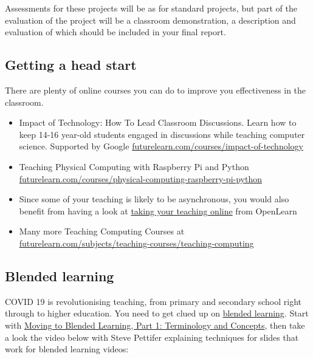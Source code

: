 \documentclass[
  12pt,
]{book}
\providecommand{\tightlist}{%
  \setlength{\itemsep}{0pt}\setlength{\parskip}{0pt}}
\begin{document}
Assessments for these projects will be as for standard projects, \citep{COMP30030, COMP30040} but part of the evaluation of the project will be a classroom demonstration, a description and evaluation of which should be included in your final report.

\hypertarget{getting-a-head-start}{%
\subsection{Getting a head start}\label{getting-a-head-start}}

There are plenty of online courses you can do to improve you effectiveness in the classroom.

\begin{itemize}
\tightlist
\item
  Impact of Technology: How To Lead Classroom Discussions. Learn how to keep 14-16 year-old students engaged in discussions while teaching computer science. Supported by Google \href{https://www.futurelearn.com/courses/impact-of-technology}{futurelearn.com/courses/impact-of-technology}
\item
  Teaching Physical Computing with Raspberry Pi and Python \href{https://www.futurelearn.com/courses/physical-computing-raspberry-pi-python}{futurelearn.com/courses/physical-computing-raspberry-pi-python}
\item
  Since some of your teaching is likely to be asynchronous, you would also benefit from having a look at \href{https://www.open.edu/openlearn/education-development/education/take-your-teaching-online/content-section-overview}{taking your teaching online} from OpenLearn
\item
  Many more Teaching Computing Courses at \href{https://www.futurelearn.com/subjects/teaching-courses/teaching-computing}{futurelearn.com/subjects/teaching-courses/teaching-computing}
\end{itemize}

\hypertarget{blended}{%
\subsection{Blended learning}\label{blended}}

COVID 19 is revolutionising teaching, from primary and secondary school right through to higher education. You need to get clued up on \href{https://en.wikipedia.org/wiki/Blended_learning}{blended learning}. Start with \href{http://www.elearning.fse.manchester.ac.uk/fseta/moving-to-blended-learning-part-1-terminology-and-concepts/}{Moving to Blended Learning, Part 1: Terminology and Concepts}, then take a look the video below with Steve Pettifer explaining techniques for slides that work for blended learning videos:
\end{document}
